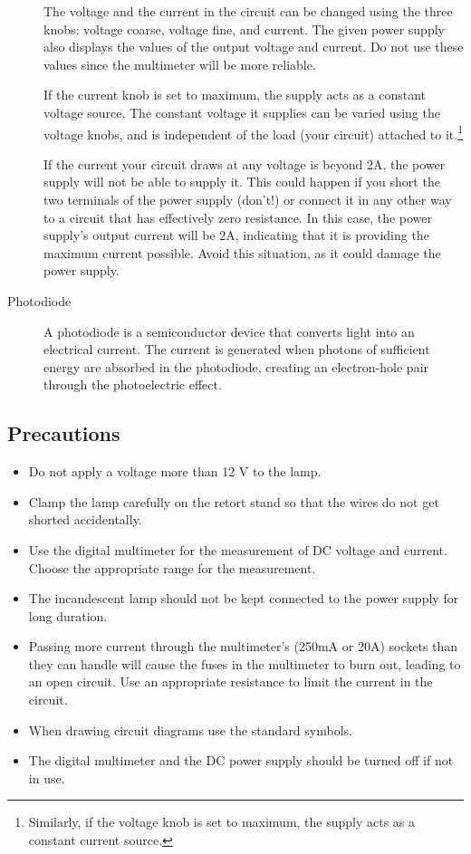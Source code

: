 \begin{refsection}
\begin{description}
The voltage and the current in the circuit can be changed using the three knobs: voltage coarse, voltage fine, and current. The given power supply also displays the values of the output voltage and current. Do not use these values since the multimeter will be more reliable. 

If the current knob is set to maximum, the supply acts as a constant voltage source. The constant voltage it supplies can be varied using the voltage knobs, and is independent of the load (your circuit) attached to it.\footnote{Similarly, if the voltage knob is set to maximum, the supply acts as a constant current source.}

\begin{imp}
If the current your circuit draws at any voltage is beyond 2A, the power supply will not be able to supply it. This could happen if you short the two terminals of the power supply (don't!) or connect it in any other way to a circuit that has effectively zero resistance. In this case, the power supply's output current will be 2A, indicating that it is providing the maximum current possible. Avoid this situation, as it could damage the power supply.
\end{imp}

\item[Photodiode]

A photodiode is a semiconductor device that converts light into an electrical current. The current is generated when photons of sufficient energy are absorbed in the photodiode, creating an electron-hole pair through the photoelectric effect.

\end{description}


\subsection*{Precautions}

\begin{itemize}
\item Do not apply a voltage more than 12 V to the lamp.
\item Clamp the lamp carefully on the retort stand so that the wires do not get shorted accidentally.
\item Use the digital multimeter for the measurement of DC voltage and current.  Choose the appropriate range for the measurement.
\item The incandescent lamp should not be kept connected to the power supply for long duration.
\item Passing more current through the multimeter's (250mA or 20A) sockets than they can handle will cause the fuses in the multimeter to burn out, leading to an open circuit. Use an appropriate resistance to limit the current in the circuit.
\item When drawing circuit diagrams use the standard symbols.
\item The digital multimeter and the DC power supply should be turned off if not in use.
\end{itemize}



\end{refsection}
